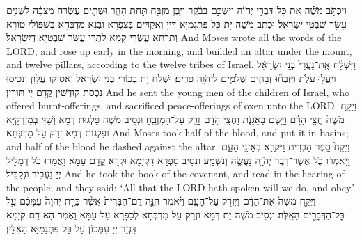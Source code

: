 {%
{וַיִּכְתֹּ֣ב מֹשֶׁ֗ה אֵ֚ת כׇּל־דִּבְרֵ֣י יְהֹוָ֔ה וַיַּשְׁכֵּ֣ם בַּבֹּ֔קֶר וַיִּ֥בֶן מִזְבֵּ֖חַ תַּ֣חַת הָהָ֑ר וּשְׁתֵּ֤ים עֶשְׂרֵה֙ מַצֵּבָ֔ה לִשְׁנֵ֥ים עָשָׂ֖ר שִׁבְטֵ֥י יִשְׂרָאֵֽל׃
}
{וּכְתַב מֹשֶׁה יָת כָּל פִּתְגָמַיָּא דַּייָ וְאַקְדֵּים בְּצַפְרָא וּבְנָא מַדְבְּחָא בְּשִׁפּוֹלֵי טוּרָא וְתַרְתַּא עֶשְׂרֵי קָמָא לִתְרֵי עֲשַׂר שִׁבְטַיָּא דְּיִשְׂרָאֵל׃}
{And Moses wrote all the words of the LORD, and rose up early in the morning, and builded an altar under the mount, and twelve pillars, according to the twelve tribes of Israel.}{}
{וַיִּשְׁלַ֗ח אֶֽת־נַעֲרֵי֙ בְּנֵ֣י יִשְׂרָאֵ֔ל וַיַּֽעֲל֖וּ עֹלֹ֑ת וַֽיִּזְבְּח֞וּ זְבָחִ֧ים שְׁלָמִ֛ים לַיהֹוָ֖ה פָּרִֽים׃
}
{וּשְׁלַח יָת בְּכוֹרֵי בְנֵי יִשְׂרָאֵל וְאַסִּיקוּ עֲלָוָן וְנַכִּיסוּ נִכְסַת קוּדְשִׁין קֳדָם יְיָ תּוֹרִין׃}
{And he sent the young men of the children of Israel, who offered burnt-offerings, and sacrificed peace-offerings of oxen unto the LORD.}{}
{וַיִּקַּ֤ח מֹשֶׁה֙ חֲצִ֣י הַדָּ֔ם וַיָּ֖שֶׂם בָּאַגָּנֹ֑ת וַחֲצִ֣י הַדָּ֔ם זָרַ֖ק עַל־הַמִּזְבֵּֽחַ׃
}
{וּנְסֵיב מֹשֶׁה פַּלְגוּת דְּמָא וְשַׁוִּי בְּמִזְרְקַיָּא וּפַלְגוּת דְּמָא זְרַק עַל מַדְבְּחָא׃}
{And Moses took half of the blood, and put it in basins; and half of the blood he dashed against the altar.}{}
{וַיִּקַּח֙ סֵ֣פֶר הַבְּרִ֔ית וַיִּקְרָ֖א בְּאׇזְנֵ֣י הָעָ֑ם וַיֹּ֣אמְר֔וּ כֹּ֛ל אֲשֶׁר־דִּבֶּ֥ר יְהֹוָ֖ה נַעֲשֶׂ֥ה וְנִשְׁמָֽע׃
}
{וּנְסֵיב סִפְרָא דִּקְיָמָא וּקְרָא קֳדָם עַמָּא וַאֲמַרוּ כֹּל דְּמַלֵּיל יְיָ נַעֲבֵיד וּנְקַבֵּיל׃}
{And he took the book of the covenant, and read in the hearing of the people; and they said: ‘All that the LORD hath spoken will we do, and obey.’}{}
{וַיִּקַּ֤ח מֹשֶׁה֙ אֶת־הַדָּ֔ם וַיִּזְרֹ֖ק עַל־הָעָ֑ם וַיֹּ֗אמֶר הִנֵּ֤ה דַֽם־הַבְּרִית֙ אֲשֶׁ֨ר כָּרַ֤ת יְהֹוָה֙ עִמָּכֶ֔ם עַ֥ל כׇּל־הַדְּבָרִ֖ים הָאֵֽלֶּה׃
}
{וּנְסֵיב מֹשֶׁה יָת דְּמָא וּזְרַק עַל מַדְבְּחָא לְכַפָּרָא עַל עַמָּא וַאֲמַר הָא דַם קְיָמָא דִּגְזַר יְיָ עִמְּכוֹן עַל כָּל פִּתְגָמַיָּא הָאִלֵּין׃}
}
